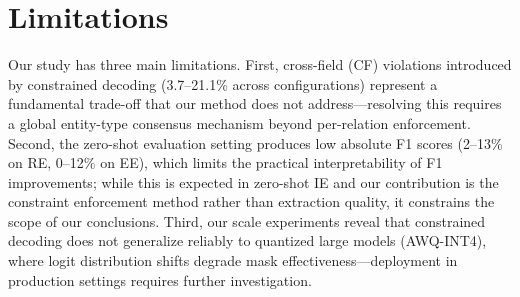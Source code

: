 \documentclass[11pt]{article}
\begin{document}
\section*{Limitations}
\label{sec:limitations}

Our study has three main limitations.
First, cross-field (CF) violations introduced by constrained decoding (3.7--21.1\% across configurations) represent a fundamental trade-off that our method does not address---resolving this requires a global entity-type consensus mechanism beyond per-relation enforcement.
Second, the zero-shot evaluation setting produces low absolute F1 scores (2--13\% on RE, 0--12\% on EE), which limits the practical interpretability of F1 improvements; while this is expected in zero-shot IE and our contribution is the constraint enforcement method rather than extraction quality, it constrains the scope of our conclusions.
Third, our scale experiments reveal that constrained decoding does not generalize reliably to quantized large models (AWQ-INT4), where logit distribution shifts degrade mask effectiveness---deployment in production settings requires further investigation.
\end{document}
